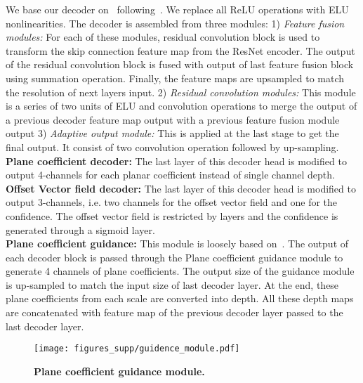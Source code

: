 \documentclass[final]{cvpr}
\newcommand{\PAR}[1]{\vskip2pt \noindent{\bf #1}}
\begin{document}
\PAR{Decoder:} We base our decoder on~\cite{decoders} following~\cite{structure:guided:ranking:loss:depth}. We replace all ReLU operations with ELU~\cite{elu} nonlinearities. The decoder is assembled from three modules: 1) \textit{Feature fusion modules:} For each of these modules, residual convolution block is used to transform the skip connection feature map from the ResNet encoder. The output of the residual convolution block is fused with output of last feature fusion block using summation operation. Finally, the feature maps are upsampled to match the resolution of next layers input. 2) \textit{Residual convolution modules:} This module is a series of two units of ELU and  convolution operations to merge the output of a previous decoder feature map output with a previous feature fusion module output 3) \textit{Adaptive output module:} This is applied at the last stage to get the final output. It consist of two  convolution operation followed by up-sampling.\\ 
\textbf{Plane coefficient decoder:} The last layer of this decoder head is modified to output 4-channels for each planar coefficient instead of single channel depth.\\ 
\textbf{Offset Vector field decoder:}  The last layer of this decoder head is modified to output 3-channels, i.e. two channels for the offset vector field and one for the confidence. The offset vector field is restricted by  layers and the confidence is generated through a sigmoid layer. \\
\textbf{Plane coefficient guidance:} This module is loosely based on~\cite{local:planar:guidance}. The output of each decoder block is passed through the Plane coefficient guidance module to generate 4 channels of plane coefficients. The output size of the guidance module is up-sampled to match the input size of last decoder layer. 
At the end, these plane coefficients from each scale are converted into depth. All these depth maps are concatenated with feature map of the previous decoder layer passed to the last decoder layer. 

\begin{figure}[t]
\texttt{[image: figures\_supp/guidence\_module.pdf]}
\caption{\textbf{Plane coefficient guidance module.}}
\label{fig:guidance_module}
\end{figure}
\end{document}
